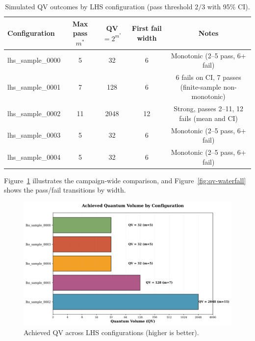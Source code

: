 \begin{table}[!htb]
  \centering
  \caption{Simulated QV outcomes by LHS configuration (pass threshold $2/3$ with 95\% CI).}
  \label{tab:qv-summary}
  \begin{tabular}{lcccc}
    \hline
    Configuration & Max pass $m^*$ & QV $=2^{m^*}$ & First fail width & Notes \\
    \hline
    lhs\_sample\_0000 & 5 & 32 & 6 & Monotonic (2--5 pass, 6+ fail) \\
    lhs\_sample\_0001 & 7 & 128 & 6 & 6 fails on CI, 7 passes (finite-sample non-monotonic) \\
    lhs\_sample\_0002 & 11 & 2048 & 12 & Strong, passes 2--11, 12 fails (mean and CI) \\
    lhs\_sample\_0003 & 5 & 32 & 6 & Monotonic (2--5 pass, 6+ fail) \\
    lhs\_sample\_0004 & 5 & 32 & 6 & Monotonic (2--5 pass, 6+ fail) \\
    \hline
  \end{tabular}
\end{table}

Figure~\ref{fig:qv-overview} illustrates the campaign-wide comparison, and Figure~\ref{fig:qv-waterfall} shows the pass/fail transitions by width.

\begin{figure}[!htb]
  \centering
  \includegraphics[width=0.85\linewidth]{plots/overview/achieved_qv_comparison.png}
  \caption{Achieved QV across LHS configurations (higher is better).}
  \label{fig:qv-overview}
\end{figure}

